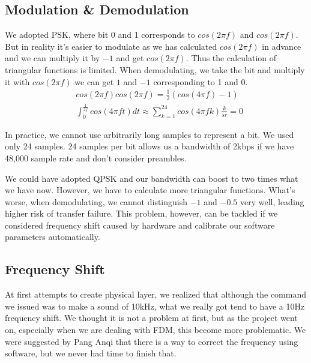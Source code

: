 \documentclass[conference,compsoc]{IEEEtran}
\begin{document}
		\subsection{Modulation \& Demodulation}
			We adopted PSK, where bit 0 and 1 corresponds to $cos(2\pi f)$ and $cos(2\pi f)$. 
			But in reality it's easier to modulate as we has calculated $cos(2\pi f)$ in advance and we can multiply it by $-1$ and get $cos(2\pi f)$.
			Thus the calculation of triangular functions is limited.
			When demodulating, we take the bit and multiply it with $cos(2\pi f)$ we can get $1$ and $-1$ corresponding to 1 and 0.
			\begin{equation*}\begin{aligned}
				& cos(2\pi f)cos(2\pi f) = \frac{1}{2}(cos(4\pi f) - 1) \\
				& \int_0^\frac{1}{2f} cos(4\pi ft)dt \approx \sum_{k=1}^{24}cos(4\pi fk)\frac{k}{sr} = 0
			\end{aligned}\end{equation*}
			\par
			In practice, we cannot use arbitrarily long samples to represent a bit. We used only 24 samples. 
			24 samples per bit allows us a bandwidth of 2kbps if we have 48,000 sample rate and don't consider preambles.
			\par
			We could have adopted QPSK and our bandwidth can boost to two times what we have now. 
			However, we have to calculate more triangular functions. 
			What's worse, when demodulating, we cannot distinguish $-1$ and $-0.5$ very well, leading higher risk of transfer failure.
			This problem, however, can be tackled if we considered frequency shift caused by hardware and calibrate our software parameters automatically.

	\subsection{Frequency Shift}
		At first attempts to create physical layer, we realized that although the command we issued was to make a sound of 10kHz, what we really got tend to have a 10Hz frequency shift.
		We thought it is not a problem at first, but as the project went on, especially when we are dealing with FDM, this become more problematic.
		We were suggested by Pang Anqi that there is a way to correct the frequency using software, but we never had time to finish that.

\end{document}
